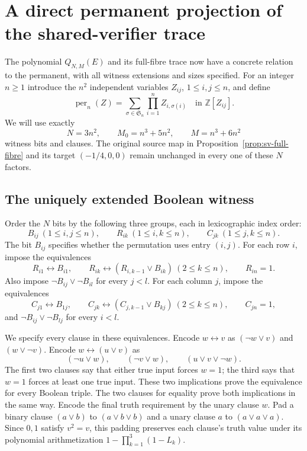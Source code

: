 \section{A direct permanent projection of the shared-verifier trace}
\label{sec:permanent-trace-projection}

The polynomial $Q_{N,M}(E)$ and its full-fibre trace now have a concrete
relation to the permanent, with all witness extensions and sizes specified.
For an integer $n\ge1$ introduce the $n^2$ independent variables
$Z_{ij}$, $1\le i,j\le n$, and define
\[
 \operatorname{per}_n(Z)=\sum_{\sigma\in\mathfrak S_n}
                  \prod_{i=1}^n Z_{i,\sigma(i)}
 \quad\text{in }\mathbb Z[Z_{ij}].
\]
We will use exactly
\begin{equation}\label{eq:per-trace-size}
 N=3n^2,\qquad M_0=n^3+5n^2,\qquad M=n^3+6n^2
\end{equation}
witness bits and clauses. The original source map in
Proposition~\ref{prop:sv-full-fibre} and its target $(-1/4,0,0)$
remain unchanged in every one of these $N$ factors.

\subsection{The uniquely extended Boolean witness}

Order the $N$ bits by the following three groups, each in lexicographic
index order:
\[
 B_{ij}\ (1\le i,j\le n),\qquad
 R_{ik}\ (1\le i,k\le n),\qquad
 C_{jk}\ (1\le j,k\le n).
\]
The bit $B_{ij}$ specifies whether the permutation uses entry $(i,j)$.
For each row $i$, impose the equivalences
\[
 R_{i1}\leftrightarrow B_{i1},\qquad
 R_{ik}\leftrightarrow(R_{i,k-1}\vee B_{ik})\ (2\le k\le n),
 \qquad R_{in}=1.
\]
Also impose $\neg B_{ij}\vee\neg B_{il}$ for every $j<l$.
For each column $j$, impose the equivalences
\[
 C_{j1}\leftrightarrow B_{1j},\qquad
 C_{jk}\leftrightarrow(C_{j,k-1}\vee B_{kj})\ (2\le k\le n),
 \qquad C_{jn}=1,
\]
and $\neg B_{ij}\vee\neg B_{lj}$ for every $i<l$.

We specify every clause in these equivalences. Encode $w\leftrightarrow v$
as $(\neg w\vee v)$ and $(w\vee\neg v)$. Encode
$w\leftrightarrow(u\vee v)$ as
\[
 (\neg u\vee w),\qquad(\neg v\vee w),\qquad
 (u\vee v\vee\neg w).
\]
The first two clauses say that either true input forces $w=1$;
the third says that $w=1$ forces at least one true input.
These two implications prove the equivalence for every Boolean triple.
The two clauses for equality prove both implications in the same way.
Encode the final truth requirement by the unary clause $w$.
Pad a binary clause $(a\vee b)$ to $(a\vee b\vee b)$ and a unary
clause $a$ to $(a\vee a\vee a)$. Since $0,1$ satisfy $v^2=v$, this
padding preserves each clause's truth value under its polynomial
arithmetization $1-\prod_{k=1}^3(1-L_k)$.

